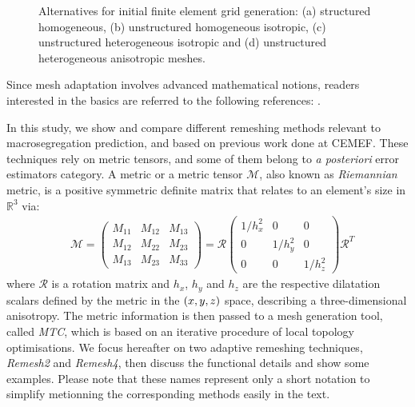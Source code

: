 \begin{figure}[b!]
\begin{subfigure}[t]{0.25\textwidth}
	\caption{}
    \label{fig:mesh_aniso_hetero_unstruct}
  \end{subfigure}
\caption{Alternatives for initial finite element grid generation: (a) structured homogeneous, (b) unstructured homogeneous isotropic,
(c) unstructured heterogeneous isotropic and (d) unstructured heterogeneous anisotropic meshes.} 
\label{fig:premeshing_options}
\end{figure}

Since mesh adaptation involves advanced mathematical notions, readers interested 
in the basics are referred to the following references:
\citep{coupez_grandes_1991,coupez_generation_2000,gruau_3d_2005,jannoun_space-time_2014}.

In this study, we show and compare different remeshing methods relevant to macrosegregation prediction, and based on previous work
done at CEMEF. These techniques rely on metric tensors, and some of them belong to
\emph{a posteriori} error estimators category. A metric or a metric tensor $\mathcal{M}$, 
also known as \emph{Riemannian} metric, is a positive symmetric definite matrix that relates 
to an element's size in $\mathbb{R}^3$ via:
\begin{align}
\label{eq:metric}
& \mathcal{M} = 
\begin{pmatrix}
M_{11} & M_{12} & M_{13} \\
M_{12} & M_{22} & M_{23} \\
M_{13} & M_{23} & M_{33}
\end{pmatrix}
=
\mathcal{R} 
\begin{pmatrix}
1/{h_x^2} & 0 & 0 \\
0 & 1/{h_y^2} & 0 \\
0 & 0 & 1/{h_z^2}
\end{pmatrix}
\mathcal{R}^T
\end{align}
where $\mathcal{R}$ is a rotation matrix and $h_x$, $h_y$ and $h_z$ are the respective 
dilatation scalars defined by the metric in the $\left( x,y,z \right)$ space, describing
a three-dimensional anisotropy.
The metric information is then passed to a mesh generation tool, called \emph{MTC},
which is based on an iterative procedure of local topology optimisations. We focus hereafter
on two adaptive remeshing techniques, \emph{Remesh2} and \emph{Remesh4}, then discuss the functional details and show some examples.
Please note that these names represent only a short notation to simplify metionning the corresponding methods easily in the text.

